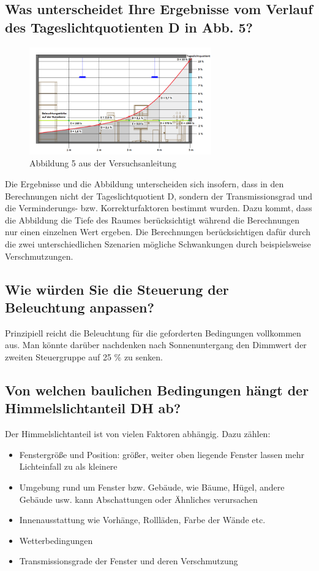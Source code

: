 \subsection{Was unterscheidet Ihre Ergebnisse vom Verlauf des Tageslichtquotienten D in Abb. 5?}


\begin{figure}[H]
    \centering
    \includegraphics[width=0.7\textwidth]{Abbildungen/abb5.png}
    \caption{Abbildung 5 aus der Versuchsanleitung }
    \label{fig:abb5}
\end{figure}

Die Ergebnisse und die Abbildung unterscheiden sich insofern, dass in den Berechnungen nicht der Tageslichtquotient D, sondern der Transmissionsgrad und die Verminderungs- bzw. Korrekturfaktoren bestimmt wurden.
Dazu kommt, dass die Abbildung die Tiefe des Raumes berücksichtigt während die Berechnungen nur einen einzelnen Wert ergeben. 
Die Berechnungen berücksichtigen dafür durch die zwei unterschiedlichen Szenarien mögliche Schwankungen durch beispielsweise Verschmutzungen.

\subsection{Wie würden Sie die Steuerung der Beleuchtung anpassen?}

Prinzipiell reicht die Beleuchtung für die geforderten Bedingungen vollkommen aus.
Man könnte darüber nachdenken nach Sonnenuntergang den Dimmwert der zweiten Steuergruppe auf 25 \% zu senken.



\subsection{Von welchen baulichen Bedingungen hängt der Himmelslichtanteil DH ab?}

Der Himmelslichtanteil ist von vielen Faktoren abhängig. Dazu zählen:
\begin{itemize}
\item Fenstergröße und Position: größer, weiter oben liegende Fenster lassen mehr Lichteinfall zu als kleinere
\item Umgebung rund um Fenster bzw. Gebäude, wie Bäume, Hügel, andere Gebäude usw. kann Abschattungen oder Ähnliches verursachen
\item Innenausstattung wie Vorhänge, Rollläden, Farbe der Wände etc. 
\item Wetterbedingungen
\item Transmissionsgrade der Fenster und deren Verschmutzung

\end{itemize}

